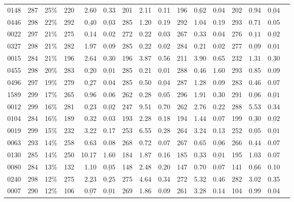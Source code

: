 \documentclass[10pt,twocolumn,letterpaper]{article}
\begin{document}
\begin{table}[t]
\begin{tabular}{lrrrrrrrrrrrrrrr}
0148 & 287 & 25\% & 220 & 2.60 & 0.33 & 201 & 2.11 & 0.11 & 196 & $\underline{\mathbf{0.62}}$ & 0.04 & 202 & 0.94 & $\underline{\mathbf{0.04}}$\\
0446 & 298 & 22\% & 292 & $\underline{\mathbf{0.40}}$ & $\underline{\mathbf{0.03}}$ & 285 & 1.20 & 0.19 & 292 & 1.04 & 0.19 & 293 & 0.71 & 0.05\\
0022 & 297 & 21\% & 275 & 0.14 & 0.02 & 272 & 0.22 & 0.03 & 267 & 0.33 & 0.04 & 276 & $\underline{\mathbf{0.11}}$ & $\underline{\mathbf{0.02}}$\\
0327 & 298 & 21\% & 282 & 1.97 & 0.09 & 285 & 0.22 & 0.02 & 284 & 0.21 & 0.02 & 277 & $\underline{\mathbf{0.09}}$ & $\underline{\mathbf{0.01}}$\\
0015 & 284 & 21\% & 196 & 2.64 & 0.30 & 196 & 3.87 & 0.56 & 211 & 3.90 & 0.65 & 232 & $\underline{\mathbf{1.31}}$ & $\underline{\mathbf{0.30}}$\\
0455 & 298 & 20\% & 283 & $\underline{\mathbf{0.20}}$ & $\underline{\mathbf{0.01}}$ & 285 & 0.21 & 0.01 & 288 & 0.46 & 1.60 & 293 & 0.85 & 0.09\\
0496 & 297 & 19\% & 279 & $\underline{\mathbf{0.27}}$ & 0.04 & 285 & 0.50 & $\underline{\mathbf{0.04}}$ & 287 & 1.28 & 0.09 & 283 & 0.46 & 0.07\\
1589 & 299 & 17\% & 265 & 0.96 & 0.06 & 262 & 0.28 & 0.05 & 296 & 1.91 & 0.30 & 291 & $\underline{\mathbf{0.06}}$ & $\underline{\mathbf{0.01}}$\\
0012 & 299 & 16\% & 281 & $\underline{\mathbf{0.23}}$ & $\underline{\mathbf{0.02}}$ & 247 & 9.51 & 0.70 & 262 & 2.76 & 0.22 & 288 & 5.53 & 0.34\\
0104 & 284 & 16\% & 189 & 0.32 & 0.03 & 193 & 2.28 & 0.18 & 194 & 1.44 & 0.07 & 199 & $\underline{\mathbf{0.30}}$ & $\underline{\mathbf{0.02}}$\\
0019 & 299 & 15\% & 232 & 3.22 & 0.17 & 253 & 6.55 & 0.28 & 264 & 3.24 & 0.13 & 252 & $\underline{\mathbf{0.05}}$ & $\underline{\mathbf{0.01}}$\\
0063 & 293 & 14\% & 258 & 0.63 & 0.08 & 268 & 0.72 & 0.07 & 267 & 0.65 & $\underline{\mathbf{0.06}}$ & 266 & $\underline{\mathbf{0.44}}$ & 0.07\\
0130 & 285 & 14\% & 250 & 10.17 & 1.60 & 184 & 1.87 & 0.16 & 185 & $\underline{\mathbf{0.33}}$ & $\underline{\mathbf{0.01}}$ & 195 & 1.03 & 0.07\\
0080 & 284 & 13\% & 132 & 1.10 & $\underline{\mathbf{0.05}}$ & 148 & 2.48 & 0.20 & 147 & 0.70 & 0.07 & 141 & $\underline{\mathbf{0.66}}$ & 0.10\\
0240 & 298 & 12\% & 275 & $\underline{\mathbf{2.23}}$ & $\underline{\mathbf{0.25}}$ & 275 & 4.64 & 0.34 & 272 & 5.32 & 0.46 & 282 & 3.02 & 0.35\\
0007 & 290 & 12\% & 106 & $\underline{\mathbf{0.07}}$ & $\underline{\mathbf{0.01}}$ & 269 & 1.86 & 0.09 & 261 & 3.28 & 0.14 & 104 & 0.99 & 0.04\\
\bottomrule
\end{tabular}
\end{table}
\end{document}
